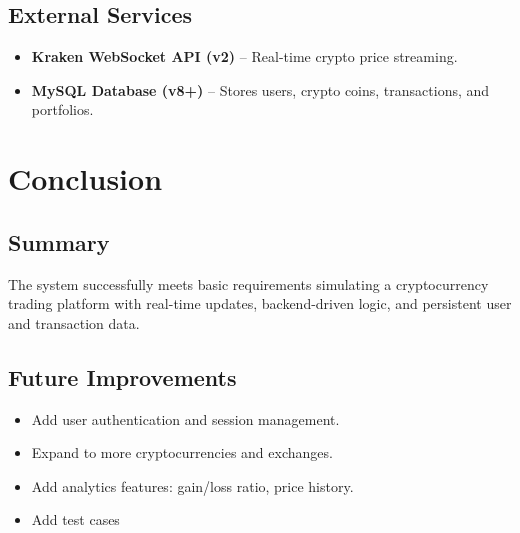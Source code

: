 \documentclass[a4paper,12pt]{article}
\begin{document}
\subsection{External Services}
\begin{itemize}[label=-, itemsep=0.2em]
    \item \textbf{Kraken WebSocket API (v2)} – Real-time crypto price streaming.
    \item \textbf{MySQL Database (v8+)} – Stores users, crypto coins, transactions, and portfolios.
\end{itemize}


\section{Conclusion}
\subsection{Summary}
The system successfully meets basic requirements simulating a cryptocurrency trading platform with real-time updates, backend-driven logic, and persistent user and transaction data.

\subsection{Future Improvements}
\begin{itemize}
    \item Add user authentication and session management.
    \item Expand to more cryptocurrencies and exchanges.
    \item Add analytics features: gain/loss ratio, price history.
    \item Add test cases
\end{itemize}
\end{document}
